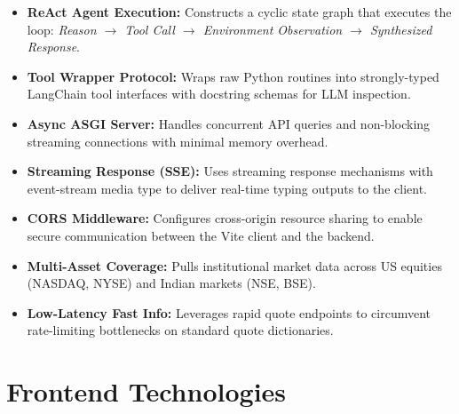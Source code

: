 \documentclass[12pt,a4paper]{report}
\begin{document}
\vspace{0.4cm}

\begin{techbox}[title=LangGraph \& LangChain]
\begin{itemize}[leftmargin=*]
  \item \textbf{ReAct Agent Execution:} Constructs a cyclic state graph that executes the loop: \textit{Reason $\rightarrow$ Tool Call $\rightarrow$ Environment Observation $\rightarrow$ Synthesized Response}.
  \item \textbf{Tool Wrapper Protocol:} Wraps raw Python routines into strongly-typed LangChain tool interfaces with docstring schemas for LLM inspection.
\end{itemize}
\end{techbox}

\vspace{0.4cm}

\begin{techbox}[title=FastAPI \& Uvicorn]
\begin{itemize}[leftmargin=*]
  \item \textbf{Async ASGI Server:} Handles concurrent API queries and non-blocking streaming connections with minimal memory overhead.
  \item \textbf{Streaming Response (SSE):} Uses streaming response mechanisms with event-stream media type to deliver real-time typing outputs to the client.
  \item \textbf{CORS Middleware:} Configures cross-origin resource sharing to enable secure communication between the Vite client and the backend.
\end{itemize}
\end{techbox}

\vspace{0.4cm}

\begin{techbox}[title=Yahoo Finance Engine (\texttt{yfinance})]
\begin{itemize}[leftmargin=*]
  \item \textbf{Multi-Asset Coverage:} Pulls institutional market data across US equities (NASDAQ, NYSE) and Indian markets (NSE, BSE).
  \item \textbf{Low-Latency Fast Info:} Leverages rapid quote endpoints to circumvent rate-limiting bottlenecks on standard quote dictionaries.
\end{itemize}
\end{techbox}

\section{Frontend Technologies}
\end{document}
